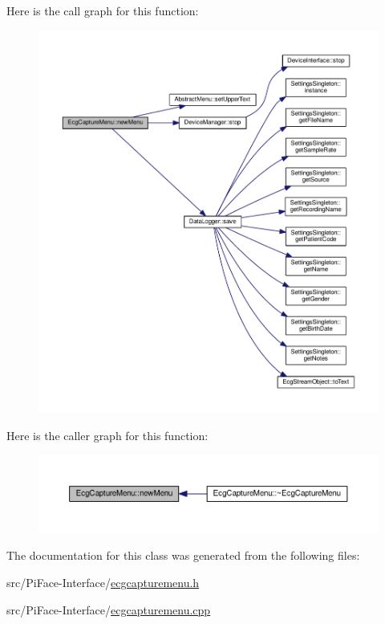 Here is the call graph for this function\+:
\nopagebreak
\begin{figure}[H]
\begin{center}
\leavevmode
\includegraphics[width=350pt]{classEcgCaptureMenu_a610d2985e09cd56cb381e6e443dbbc72_cgraph}
\end{center}
\end{figure}




Here is the caller graph for this function\+:
\nopagebreak
\begin{figure}[H]
\begin{center}
\leavevmode
\includegraphics[width=350pt]{classEcgCaptureMenu_a610d2985e09cd56cb381e6e443dbbc72_icgraph}
\end{center}
\end{figure}




The documentation for this class was generated from the following files\+:\begin{DoxyCompactItemize}
\item 
src/\+Pi\+Face-\/\+Interface/\hyperlink{ecgcapturemenu_8h}{ecgcapturemenu.\+h}\item 
src/\+Pi\+Face-\/\+Interface/\hyperlink{ecgcapturemenu_8cpp}{ecgcapturemenu.\+cpp}\end{DoxyCompactItemize}
